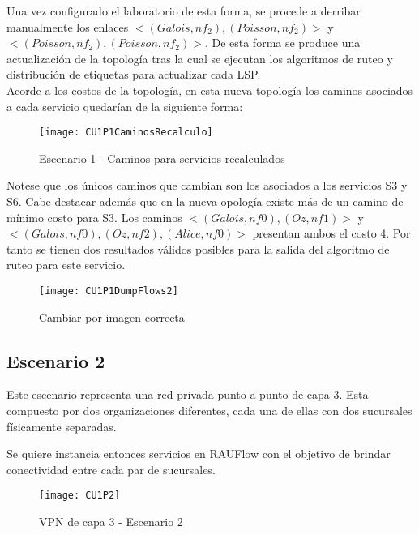 Una vez configurado el laboratorio de esta forma, se procede a derribar manualmente los enlaces $<(Galois, nf_2), (Poisson, nf_2)>$ y $<(Poisson, nf_2), (Poisson, nf_2)>$. De esta forma se produce una actualizaci\'on de la topolog\'ia tras la cual se ejecutan los algoritmos de ruteo y distribución de etiquetas para actualizar cada LSP.\\

Acorde a los costos de la topolog\'ia, en esta nueva topolog\'ia los caminos asociados a cada servicio quedar\'ian de la siguiente forma:

\begin{figure}[ht!] 
\centering    
\texttt{[image: CU1P1CaminosRecalculo]}
\caption[Escenario 1 - Caminos para servicios recalculados]{Escenario 1 - Caminos para servicios recalculados}
\label{fig:CUP1Caminos2}
\end{figure}
 
Notese que los \'unicos caminos que cambian son los asociados a los servicios S3 y S6. Cabe destacar adem\'as que en la nueva opolog\'ia existe m\'as de un camino de m\'inimo costo para S3. Los caminos $<(Galois, nf0), (Oz, nf1)>$ y $<(Galois, nf0), (Oz, nf2), (Alice, nf0)>$ presentan ambos el costo 4.
Por tanto se tienen dos resultados v\'alidos posibles para la salida del algoritmo de ruteo para este servicio.\\

\begin{figure}[ht!] 
\centering    
\texttt{[image: CU1P1DumpFlows2]}
\caption[Cambiar por imagen correcta]{Cambiar por imagen correcta}
\label{fig:CU1P1DumpFlows2}
\end{figure}

\newpage
\subsection{Escenario 2}

Este escenario representa una red privada punto a punto de capa 3. Esta compuesto por dos organizaciones diferentes, cada una de ellas con dos sucursales f\'isicamente separadas.

Se quiere instancia entonces servicios en RAUFlow con el objetivo de brindar conectividad entre cada par de sucursales.
 
\begin{figure}[ht!] 
\centering    
\texttt{[image: CU1P2]}
\caption[VPN de capa 3 - Escenario 2]{VPN de capa 3 - Escenario 2}
\label{fig:CUP2}
\end{figure}

